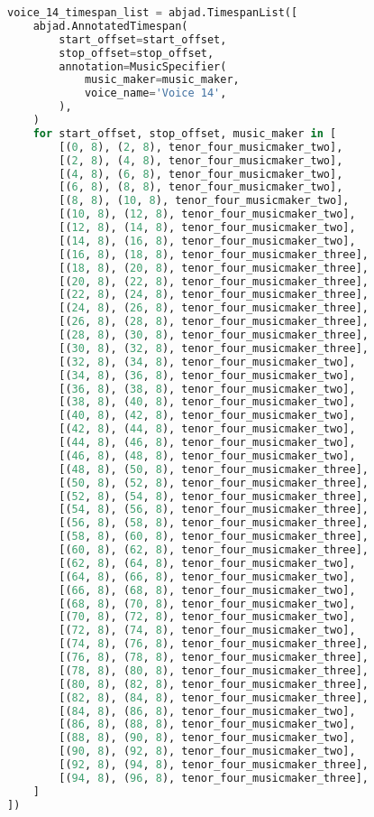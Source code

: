 \begin{lstlisting}[language=Python, caption=Invocation Source Code]
voice_14_timespan_list = abjad.TimespanList([
    abjad.AnnotatedTimespan(
        start_offset=start_offset,
        stop_offset=stop_offset,
        annotation=MusicSpecifier(
            music_maker=music_maker,
            voice_name='Voice 14',
        ),
    )
    for start_offset, stop_offset, music_maker in [
        [(0, 8), (2, 8), tenor_four_musicmaker_two],
        [(2, 8), (4, 8), tenor_four_musicmaker_two],
        [(4, 8), (6, 8), tenor_four_musicmaker_two],
        [(6, 8), (8, 8), tenor_four_musicmaker_two],
        [(8, 8), (10, 8), tenor_four_musicmaker_two],
        [(10, 8), (12, 8), tenor_four_musicmaker_two],
        [(12, 8), (14, 8), tenor_four_musicmaker_two],
        [(14, 8), (16, 8), tenor_four_musicmaker_two],
        [(16, 8), (18, 8), tenor_four_musicmaker_three],
        [(18, 8), (20, 8), tenor_four_musicmaker_three],
        [(20, 8), (22, 8), tenor_four_musicmaker_three],
        [(22, 8), (24, 8), tenor_four_musicmaker_three],
        [(24, 8), (26, 8), tenor_four_musicmaker_three],
        [(26, 8), (28, 8), tenor_four_musicmaker_three],
        [(28, 8), (30, 8), tenor_four_musicmaker_three],
        [(30, 8), (32, 8), tenor_four_musicmaker_three],
        [(32, 8), (34, 8), tenor_four_musicmaker_two],
        [(34, 8), (36, 8), tenor_four_musicmaker_two],
        [(36, 8), (38, 8), tenor_four_musicmaker_two],
        [(38, 8), (40, 8), tenor_four_musicmaker_two],
        [(40, 8), (42, 8), tenor_four_musicmaker_two],
        [(42, 8), (44, 8), tenor_four_musicmaker_two],
        [(44, 8), (46, 8), tenor_four_musicmaker_two],
        [(46, 8), (48, 8), tenor_four_musicmaker_two],
        [(48, 8), (50, 8), tenor_four_musicmaker_three],
        [(50, 8), (52, 8), tenor_four_musicmaker_three],
        [(52, 8), (54, 8), tenor_four_musicmaker_three],
        [(54, 8), (56, 8), tenor_four_musicmaker_three],
        [(56, 8), (58, 8), tenor_four_musicmaker_three],
        [(58, 8), (60, 8), tenor_four_musicmaker_three],
        [(60, 8), (62, 8), tenor_four_musicmaker_three],
        [(62, 8), (64, 8), tenor_four_musicmaker_two],
        [(64, 8), (66, 8), tenor_four_musicmaker_two],
        [(66, 8), (68, 8), tenor_four_musicmaker_two],
        [(68, 8), (70, 8), tenor_four_musicmaker_two],
        [(70, 8), (72, 8), tenor_four_musicmaker_two],
        [(72, 8), (74, 8), tenor_four_musicmaker_two],
        [(74, 8), (76, 8), tenor_four_musicmaker_three],
        [(76, 8), (78, 8), tenor_four_musicmaker_three],
        [(78, 8), (80, 8), tenor_four_musicmaker_three],
        [(80, 8), (82, 8), tenor_four_musicmaker_three],
        [(82, 8), (84, 8), tenor_four_musicmaker_three],
        [(84, 8), (86, 8), tenor_four_musicmaker_two],
        [(86, 8), (88, 8), tenor_four_musicmaker_two],
        [(88, 8), (90, 8), tenor_four_musicmaker_two],
        [(90, 8), (92, 8), tenor_four_musicmaker_two],
        [(92, 8), (94, 8), tenor_four_musicmaker_three],
        [(94, 8), (96, 8), tenor_four_musicmaker_three],
    ]
])


\end{lstlisting}
